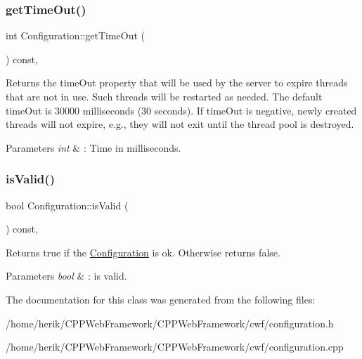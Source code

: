 \subsubsection{\texorpdfstring{get\+Time\+Out()}{getTimeOut()}}
{\footnotesize\ttfamily int Configuration\+::get\+Time\+Out (\begin{DoxyParamCaption}{ }\end{DoxyParamCaption}) const\hspace{0.3cm}{\ttfamily [inline]}, {\ttfamily [noexcept]}}



Returns the time\+Out property that will be used by the server to expire threads that are not in use. Such threads will be restarted as needed. The default time\+Out is 30000 milliseconds (30 seconds). If time\+Out is negative, newly created threads will not expire, e.\+g., they will not exit until the thread pool is destroyed. 


\begin{DoxyParams}{Parameters}
{\em int} & \+: Time in milliseconds. \\
\hline
\end{DoxyParams}
\mbox{\label{class_configuration_aad998fe40caeeb4c412f00f0874c67c9}} 
\subsubsection{\texorpdfstring{is\+Valid()}{isValid()}}
{\footnotesize\ttfamily bool Configuration\+::is\+Valid (\begin{DoxyParamCaption}{ }\end{DoxyParamCaption}) const\hspace{0.3cm}{\ttfamily [inline]}, {\ttfamily [noexcept]}}



Returns true if the \hyperlink{class_configuration}{Configuration} is ok. Otherwise returns false. 


\begin{DoxyParams}{Parameters}
{\em bool} & \+: is valid. \\
\hline
\end{DoxyParams}


The documentation for this class was generated from the following files\+:\begin{DoxyCompactItemize}
\item 
/home/herik/\+C\+P\+P\+Web\+Framework/\+C\+P\+P\+Web\+Framework/cwf/configuration.\+h\item 
/home/herik/\+C\+P\+P\+Web\+Framework/\+C\+P\+P\+Web\+Framework/cwf/configuration.\+cpp\end{DoxyCompactItemize}
